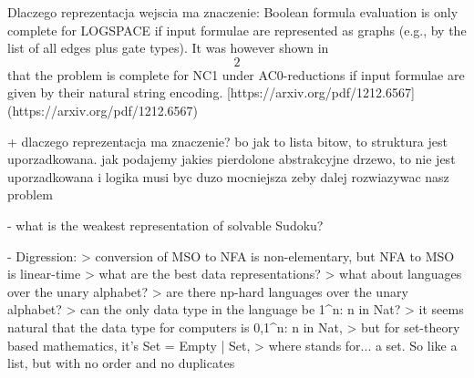 

Dlaczego reprezentacja wejscia ma znaczenie:  
Boolean formula evaluation is only complete for LOGSPACE if input formulae are represented as graphs  
(e.g., by the list of all edges plus gate types). It was however shown in \[2\] that the problem is complete for  
NC1 under AC0-reductions if input formulae are given by their natural string encoding.  
[https://arxiv.org/pdf/1212.6567](https://arxiv.org/pdf/1212.6567)

+ dlaczego reprezentacja ma znaczenie? bo jak to lista bitow, to struktura jest uporzadkowana. jak podajemy jakies pierdolone abstrakcyjne drzewo, to nie jest uporzadkowana i logika musi byc duzo mocniejsza zeby dalej rozwiazywac nasz problem\!


- what is the weakest representation of solvable Sudoku?

- Digression:
> conversion of MSO to NFA is non-elementary, but NFA to MSO is linear-time  
> what are the best data representations?  
> what about languages over the unary alphabet?  
> are there np-hard languages over the unary alphabet?  
> can the only data type in the language be {1^n: n in Nat}?  
> it seems natural that the data type for computers is { {0,1}^n: n in Nat},  
> but for set-theory based mathematics, it's Set = Empty | {Set},  
> where {} stands for... a set. So like a list, but with no order and no duplicates
